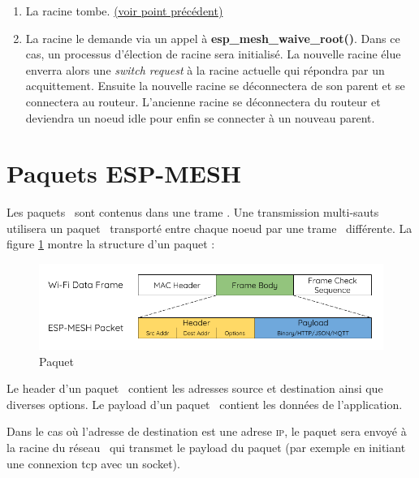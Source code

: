                 \begin{enumerate}
                    \item La racine tombe. \hyperref[root_fail]{(voir point précédent)}
                    \item La racine le demande via un appel à \textbf{esp\_mesh\_waive\_root()}.
                        Dans ce cas, un processus d'élection de racine sera initialisé. La nouvelle racine élue
                        enverra alors une \textit{switch request} à la racine actuelle qui répondra par un acquittement.
                        Ensuite la nouvelle racine se déconnectera de son parent et se connectera au routeur.
                        L'ancienne racine se déconnectera du routeur et deviendra un noeud idle pour enfin se connecter à un nouveau parent.
                \end{enumerate}
        \section{Paquets ESP-MESH}
            Les paquets \espmesh\ sont contenus dans une trame \wifi. Une transmission multi-sauts utilisera un paquet \espmesh\ transporté 
            entre chaque noeud par une trame \wifi\ différente.
            La figure \ref{fig_meshPacket} montre la structure d'un paquet \espmesh:\\

            \begin{figure}[H]
                \centering
                \includegraphics[scale=0.5]{images/mesh-packet.png}
                \caption{Paquet \espmesh\ \cite{esp-mesh}}
                \label{fig_meshPacket}
            \end{figure}
            Le header d'un paquet \espmesh\ contient les adresses source et destination ainsi que diverses options.
            Le payload d'un paquet \espmesh\ contient les données de l'application.

            Dans le cas où l'adresse de destination est une adrese \textsc{ip}, le paquet sera envoyé à la racine du réseau
            \espmesh\ qui transmet le payload du paquet (par exemple en initiant une connexion tcp avec un socket).
